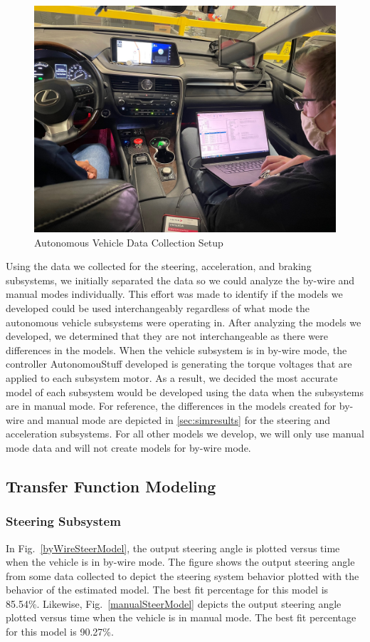 \documentclass[journal,twoside,web]{ieeecolor}
\begin{document}
\begin{figure}[htbp]
	\centering
    	\includegraphics[width=.48\textwidth]{figs/img/picturesVisitToAStuff/dataColletionSetup1-20211007}
    	\caption{Autonomous Vehicle Data Collection Setup}
    	\label{fig:vehicleSetup}
\end{figure}

Using the data we collected for the steering, acceleration, and braking subsystems, we initially separated the data so we could analyze the by-wire and manual modes individually. This effort was made to identify if the models we developed could be used interchangeably regardless of what mode the autonomous vehicle subsystems were operating in. After analyzing the models we developed, we determined that they are not interchangeable as there were differences in the models. When the vehicle subsystem is in by-wire mode, the controller AutonomouStuff developed is generating the torque voltages that are applied to each subsystem motor. As a result, we decided the most accurate model of each subsystem would be developed using the data when the subsystems are in manual mode. For reference, the differences in the models created for by-wire and manual mode are depicted in \ref{sec:simresults} for the steering and acceleration subsystems. For all other models we develop, we will only use manual mode data and will not create models for by-wire mode.


\subsection{Transfer Function Modeling}
\label{sec:TransferFunctionModeling}


\subsubsection{Steering Subsystem}
In Fig.~\ref{byWireSteerModel}, the output steering angle is plotted versus time
when the vehicle is in by-wire mode. The figure shows the output steering angle
from some data collected to depict the steering system behavior plotted with the
behavior of the estimated model. The best fit percentage for this model is
85.54\%. Likewise, Fig.~\ref{manualSteerModel} depicts the output steering angle
plotted versus time when the vehicle is in manual mode. The best fit percentage
for this model is 90.27\%.
\end{document}
